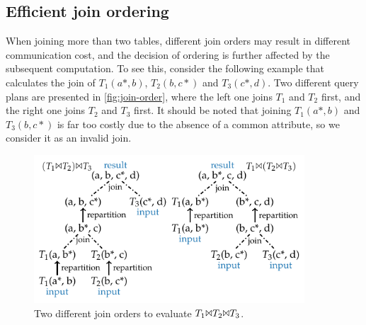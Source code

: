 \documentclass{sokendai_thesis} %
\begin{document}

\subsection{Efficient join ordering}
\label{sec:join-more}

When joining more than two tables, different join orders may result in different communication cost, and the decision of ordering is further affected by the subsequent computation.
To see this, consider the following example that calculates the join of $T_1(a*, b)$, $T_2(b, c*)$ and $T_3(c*, d)$.
Two different query plans are presented in \autoref{fig:join-order}, where the left one joins $T_1$ and $T_2$ first, and the right one joins $T_2$ and $T_3$ first.
It should be noted that joining $T_1(a*, b)$ and $T_3(b, c*)$ is far too costly due to the absence of a common attribute, so we consider it as an invalid join.

\begin{figure}
\centering
\includegraphics[width=0.9\textwidth]{figures/join-order.pdf}
\caption{Two different join orders to evaluate $T_1 \Bowtie T_2 \Bowtie T_3$.}
\label{fig:join-order}
\end{figure}
\end{document}

